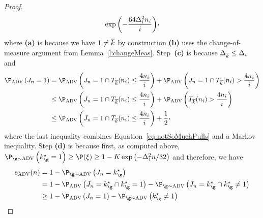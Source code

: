 \begin{proof}
\begin{align*}
	\exp\left(-\frac{64\gap^2_{i}\timeHorizon_i}{i}\right)\!\CommaBin
	\end{align*}
	where 
	\textbf{(a)}  is because we have $1\neq\overline k$ by construction
	\textbf{(b)} uses the change-of-measure argument from Lemma~\ref{l:changeMeas}. 
	Step~\textbf{(c)} is because $\Delta_{\overline k}\leq\Delta_i$ and 
	\begin{align*}
	\Pro_{\advPro}\left(\recomArm_\timeHorizon=1 \right)
	&=
	\Pro_{\advPro}\left(\recomArm_\timeHorizon=1 \cap 
	\pullsNumber_{\refarm} (\timeHorizon_i) \leq  \frac{4\timeHorizon_i}{i} \right)
	+
	\Pro_{\advPro}\left(\recomArm_\timeHorizon=1 \cap 
	\pullsNumber_{\refarm} (\timeHorizon_i)>  \frac{4\timeHorizon_i}{i} \right)\\
	&\leq
	\Pro_{\advPro}\left(\recomArm_\timeHorizon=1 \cap 
	\pullsNumber_{\refarm} (\timeHorizon_i) \leq  \frac{4\timeHorizon_i}{i}\right)
	+
	\Pro_{\advPro}\left( \pullsNumber_{\refarm} (\timeHorizon_i)> \frac{4\timeHorizon_i}{i} \right)\\
	&\leq
	\Pro_{\advPro}\left(\recomArm_\timeHorizon=1 \cap \pullsNumber_{\refarm} (\timeHorizon_i) \leq \frac{4\timeHorizon_i}{i} \right)
	+
	\frac12\CommaBin
	\end{align*}
	where the last inequality combines 
	Equation~\ref{eq:notSoMuchPulls} and a Markov inequality.
	Step \textbf{(d)} %
	is because first, as computed above,
	$\Pro_{\gainVector\sim\advPro}\left(\bestArm_{\gainVector}=1\right)\geq \Pro(\eventc) \geq 1-\nArms\exp\left(-\gap^2_1\timeHorizon/32\right)$  
	and therefore,
	we have
	\begin{align*}
	\ProErr_{\advPro}(\timeHorizon)
	&    =
	1- \Pro_{\gainVector\sim\advPro}
	\left(\recomArm_\timeHorizon=\bestArm_{\gainVector}\right)\\
	&    =
	1- \Pro_{\advPro}\left(\recomArm_\timeHorizon=\bestArm_{\gainVector}\cap\bestArm_{\gainVector}=1\right)
	- \Pro_{\gainVector\sim\advPro}
	\left(\recomArm_\timeHorizon=\bestArm_{\gainVector}\cap\bestArm_{\gainVector}\neq 1\right)\\
	&    \geq
	1-
	\Pro_{\advPro}\left(\recomArm_\timeHorizon=1\right)
	-      \Pro_{\gainVector\sim\advPro}
	\left(\bestArm_{\gainVector}\neq 1\right)\\

\end{align*}
\end{proof}

